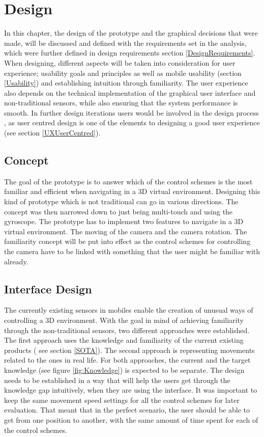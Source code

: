 \chapter{Design}
In this chapter, the design of the prototype and the graphical decisions that were made, will be discussed and defined with the requirements set in the analysis, which were further defined in  design requirements section \ref{DesignRequirements}. When designing, different aspects will be taken into consideration for user experience; usability goals and principles as well as mobile usability (section \ref{Usability}) and  establishing intuition through familiarity. The user experience also depends on the technical implementation of the graphical user interface and non-traditional sensors, while also ensuring that the system performance is smooth. In further design iterations users would be involved in the design process , as user centred design is one of the elements to designing a good user experience (see section \ref{UXUserCentred}).
\section{Concept}
The goal of the prototype is to answer which of the control schemes is the most familiar and efficient when navigating in a 3D virtual environment. Designing this kind of prototype which is not traditional can go in various directions. The concept was then narrowed down to just being multi-touch and using the gyroscope.
The prototype has to implement two features to navigate in a 3D virtual environment. The moving of the camera and the camera rotation. The familiarity concept will be put into effect as the control schemes for controlling the camera have to be linked with something that the user might be familiar with already. 

\section{Interface Design}
The currently existing sensors in mobiles enable the creation of unusual ways of controlling a 3D environment. With the goal in mind of achieving familiarity through the non-traditional sensors, two different approaches were established. The first approach uses the knowledge and familiarity of the current existing products ( see section \ref{SOTA}). The second approach is representing movements related to the ones in real life. For both approaches, the current and the target knowledge (see figure \ref{fig:Knowledge}) is expected to be separate. The design needs to be established in a way that will help the users get through the knowledge gap intuitively, when they are using the interface. It was important to keep the same movement speed settings for all the control schemes for later evaluation. That meant that in the perfect scenario, the user should be able to get from one position to another, with the same amount of time spent for each of the control schemes.

